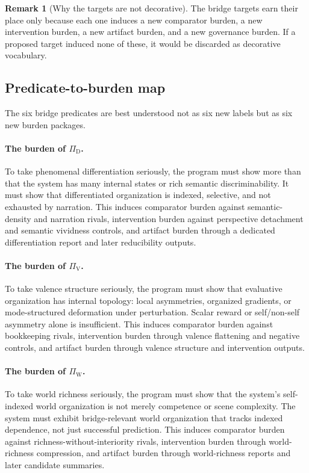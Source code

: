 \documentclass[11pt,a4paper]{article}
\theoremstyle{definition}
\newtheorem{remark}[theorem]{Remark}
\newcommand{\PiD}{\Pi_{\mathrm{D}}}
\newcommand{\PiV}{\Pi_{\mathrm{V}}}
\newcommand{\PiW}{\Pi_{\mathrm{W}}}
\begin{document}
\begin{remark}[Why the targets are not decorative]
The bridge targets earn their place only because each one induces a new comparator burden, a new intervention burden, a new artifact burden, and a new governance burden. If a proposed target induced none of these, it would be discarded as decorative vocabulary.
\end{remark}

\subsection{Predicate-to-burden map}
The six bridge predicates are best understood not as six new labels but as six new burden packages.

\paragraph{The burden of $\PiD$.}
To take phenomenal differentiation seriously, the program must show more than that the system has many internal states or rich semantic discriminability. It must show that differentiated organization is indexed, selective, and not exhausted by narration. This induces comparator burden against semantic-density and narration rivals, intervention burden against perspective detachment and semantic vividness controls, and artifact burden through a dedicated differentiation report and later reducibility outputs.

\paragraph{The burden of $\PiV$.}
To take valence structure seriously, the program must show that evaluative organization has internal topology: local asymmetries, organized gradients, or mode-structured deformation under perturbation. Scalar reward or self/non-self asymmetry alone is insufficient. This induces comparator burden against bookkeeping rivals, intervention burden through valence flattening and negative controls, and artifact burden through valence structure and intervention outputs.

\paragraph{The burden of $\PiW$.}
To take world richness seriously, the program must show that the system's self-indexed world organization is not merely competence or scene complexity. The system must exhibit bridge-relevant world organization that tracks indexed dependence, not just successful prediction. This induces comparator burden against richness-without-interiority rivals, intervention burden through world-richness compression, and artifact burden through world-richness reports and later candidate summaries.
\end{document}
